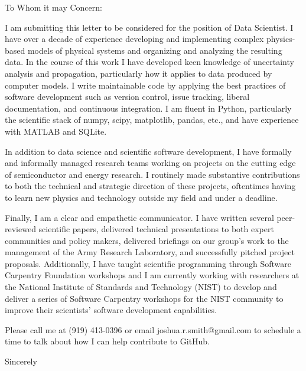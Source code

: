 \documentclass[letterpaper,10pt]{letter}
\begin{document}

\begin{letter}{}

\address{2515 13th St NW\\
         Apt. 510\\
         Washington, DC 20009}

\opening{To Whom it may Concern:}

I am submitting this letter to be considered for the position of Data Scientist.
I have over a decade of experience developing and implementing complex physics-based models of physical systems and organizing and analyzing the resulting data.
In the course of this work I have developed keen knowledge of uncertainty analysis and propagation, particularly how it applies to data produced by computer models.
I write maintainable code by applying the best practices of software development such as version control, issue tracking, liberal documentation, and continuous integration. 
I am fluent in Python, particularly the scientific stack of numpy, scipy, matplotlib, pandas, etc., and have experience with MATLAB and SQLite.


In addition to data science and scientific software development, I have formally and informally managed research teams working on projects on the cutting edge of semiconductor and energy research.
I routinely made substantive contributions to both the technical and strategic direction of these projects, oftentimes having to learn new physics and technology outside my field and under a deadline.


Finally, I am a clear and empathetic communicator. 
I have written several peer-reviewed scientific papers, delivered technical presentations to both expert communities and policy makers, delivered briefings on our group's work to the management of the Army Research Laboratory, and successfully pitched project proposals.
Additionally, I have taught scientific programming through Software Carpentry Foundation workshops and I am currently working with researchers at the National Institute of Standards and Technology (NIST) to develop and deliver a series of Software Carpentry workshops for the NIST community to improve their scientists' software development capabilities.


Please call me at (919) 413-0396 or email joshua.r.smith@gmail.com to schedule a time to talk about how I can help contribute to GitHub.


\signature{Joshua Ryan Smith}

\closing{Sincerely}


\end{letter}
\end{document}
